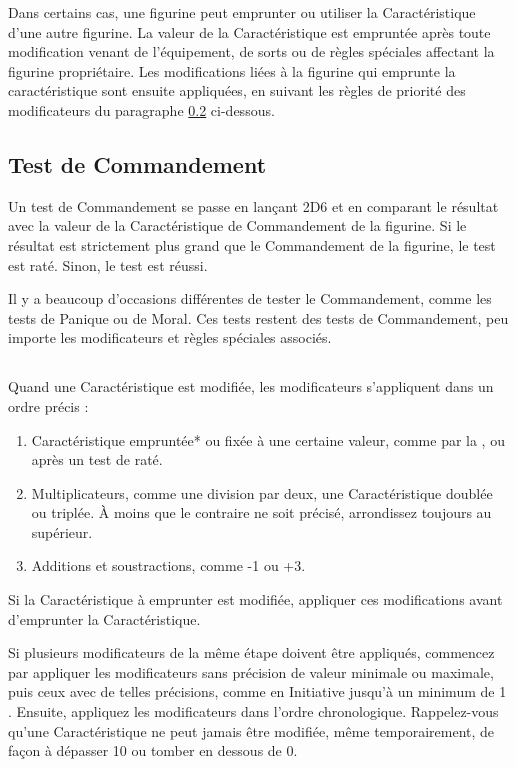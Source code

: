 Dans certains cas,  une figurine peut emprunter ou utiliser la Caractéristique d'une autre figurine. La valeur de la Caractéristique est empruntée après toute modification venant de l'équipement, de sorts ou de règles spéciales affectant la figurine propriétaire. Les modifications liées à la figurine qui emprunte la caractéristique sont ensuite appliquées, en suivant les règles de priorité des modificateurs du paragraphe \ref{priority_of_modifiers} ci-dessous.

\subsection{Test de Commandement}

Un test de Commandement se passe en lançant 2D6 et en comparant le résultat avec la valeur de la Caractéristique de Commandement de la figurine. Si le résultat est strictement plus grand que le Commandement de la figurine, le test est raté. Sinon, le test est réussi. 

Il y a beaucoup d'occasions différentes de tester le Commandement, comme les tests de Panique ou de Moral. Ces tests restent des tests de Commandement, peu importe les modificateurs et règles spéciales associés.

\subsection[Priorité des modificateurs]{}
\label{priority_of_modifiers}

Quand une Caractéristique est modifiée, les modificateurs s'appliquent dans un ordre précis :
\begin{enumerate}
\item Caractéristique empruntée* ou fixée à une certaine valeur, comme par la \inspiringpresence{}, ou après un test de \fear{} raté.
\item Multiplicateurs, comme une division par deux, une Caractéristique doublée ou triplée. À moins que le contraire ne soit précisé, arrondissez toujours au supérieur.
\item Additions et soustractions, comme -1 ou +3.
\end{enumerate}
\noindent * Si la Caractéristique à emprunter est modifiée, appliquer ces modifications avant d'emprunter la Caractéristique. 

Si plusieurs modificateurs de la même étape doivent être appliqués, commencez par appliquer les modificateurs sans précision de valeur minimale ou maximale, puis ceux avec de telles précisions, comme  en Initiative jusqu'à un minimum de 1 \fg{}. Ensuite, appliquez les modificateurs dans l'ordre chronologique. Rappelez-vous qu'une Caractéristique ne peut jamais être modifiée, même temporairement, de façon à dépasser 10 ou tomber en dessous de 0.


